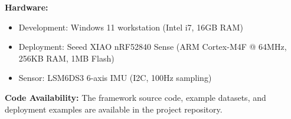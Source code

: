 \textbf{Hardware:}
\begin{itemize}
    \item Development: Windows 11 workstation (Intel i7, 16GB RAM)
    \item Deployment: Seeed XIAO nRF52840 Sense (ARM Cortex-M4F @ 64MHz, 256KB RAM, 1MB Flash)
    \item Sensor: LSM6DS3 6-axis IMU (I2C, 100Hz sampling)
\end{itemize}

\textbf{Code Availability:}
The framework source code, example datasets, and deployment examples are available in the project repository.